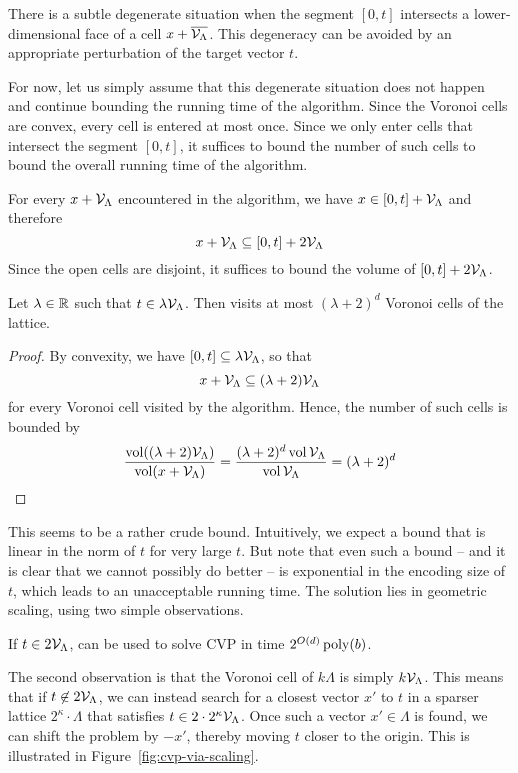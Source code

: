 There is a subtle degenerate situation when the segment $[0,t]$ intersects a lower-dimensional
face of a cell $x + \overline{\mathcal{V}_\Lambda}$.
This degeneracy can be avoided by an appropriate perturbation of the target vector $t$.

For now, let us simply assume that this degenerate situation does not happen
and continue bounding the running time of the algorithm.
Since the Voronoi cells are convex, every cell is entered at most once.
Since we only enter cells that intersect the segment $[0,t]$,
it suffices to bound the number of such cells
to bound the overall running time of the algorithm.

For every $x + \mathcal{V}_\Lambda$ encountered in the algorithm,
we have $x \in [0,t] + \mathcal{V}_\Lambda$
and therefore
\[
  x + \mathcal{V}_\Lambda \subseteq [0,t] + 2 \mathcal{V}_\Lambda
\]
Since the open cells are disjoint,
it suffices to bound the volume of $[0,t] + 2 \mathcal{V}_\Lambda$.
\begin{lemma}
  Let $\lambda \in \mathbb{R}$ such that $t \in \lambda \mathcal{V}_\Lambda$.
  Then  visits at most $(\lambda+2)^d$ Voronoi cells of the lattice.
\end{lemma}
\begin{proof}
  By convexity, we have $[0,t] \subseteq \lambda \mathcal{V}_\Lambda$,
  so that
  \[
    x + \mathcal{V}_\Lambda \subseteq (\lambda + 2) \mathcal{V}_\Lambda
  \]
  for every Voronoi cell visited by the algorithm.
  Hence, the number of such cells is bounded by
  \[
    \frac{\operatorname{vol}((\lambda + 2) \mathcal{V}_\Lambda)}{\operatorname{vol}(x + \mathcal{V}_\Lambda)}
      = \frac{(\lambda + 2)^d \operatorname{vol} \mathcal{V}_\Lambda }{\operatorname{vol} \mathcal{V}_\Lambda}
      = (\lambda + 2)^d \qedhere
  \]
\end{proof}
This seems to be a rather crude bound.
Intuitively, we expect a bound that is linear in the norm of $t$ for very large $t$.
But note that even such a bound -- and it is clear that we cannot possibly do better --
is exponential in the encoding size of $t$, which leads to an unacceptable running time.
The solution lies in geometric scaling, using two simple observations.
\begin{corollary}
  If $t \in 2\mathcal{V}_\Lambda$,
   can be used to solve CVP in time $2^{O(d)} \operatorname{poly}(b)$.
\end{corollary}

The second observation is that the Voronoi cell of $k \Lambda$ is simply $k \mathcal{V}_\Lambda$.
This means that if $t \not\in 2\mathcal{V}_\Lambda$,
we can instead search for a closest vector $x'$ to $t$
in a sparser lattice $2^\kappa \cdot \Lambda$
that satisfies $t \in 2 \cdot 2^\kappa \mathcal{V}_\Lambda$.
Once such a vector $x' \in \Lambda$ is found,
we can shift the problem by $-x'$,
thereby moving $t$ closer to the origin.
This is illustrated in Figure~\ref{fig:cvp-via-scaling}.

